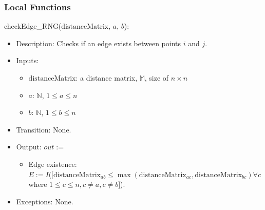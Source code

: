 \documentclass[12pt, titlepage]{article}
\begin{document}
\subsubsection{Local Functions}
\noindent checkEdge\_RNG($\mbox{distanceMatrix}$, $a$, $b$):
\begin{itemize}
\item Description: Checks if an edge exists between points $i$ and $j$.
\item Inputs:
\begin{itemize}
\item $\mbox{distanceMatrix}$: a distance matrix, $\mathbb{M}$, size of $n \times n$
\item $a$: $\mathbb{N}$, $1 \leq a \leq n$
\item $b$: $\mathbb{N}$, $1 \leq b \leq n$
\end{itemize}
\item Transition: None.
\item Output: $out:=$
\begin{itemize}
\item Edge existence:
$E := I([\mbox{distanceMatrix}_{ab} \leq \max(\mbox{distanceMatrix}_{ac}, \mbox{distanceMatrix}_{bc}) \forall c $ where $1 \leq c \leq n, c \neq a, c \neq b ]$).
\end{itemize}
\item Exceptions: None.
\end{itemize}

\newpage

{}




\end{document}
